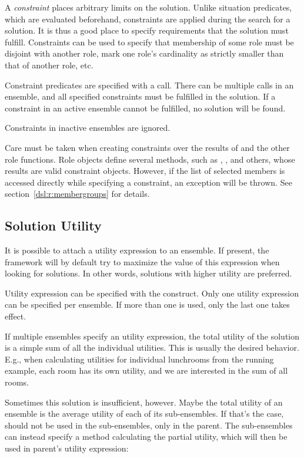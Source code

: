 A \textit{constraint} places arbitrary limits on the solution. Unlike situation
predicates, which are evaluated beforehand, constraints are applied during the search
for a solution. It is thus a good place to specify requirements that the solution must
fulfill. Constraints can be used to specify that membership of some role must be
disjoint with another role, mark one role's cardinality as strictly smaller than that of
another role, etc.

Constraint predicates are specified with a  call. There can be multiple
 calls in an ensemble, and all specified constraints must be fulfilled in
the solution. If a constraint in an active ensemble cannot be fulfilled, no solution
will be found.

Constraints in inactive ensembles are ignored.

Care must be taken when creating constraints over the results of  and the
other role functions. Role objects define several methods, such as , ,
and others, whose results are valid constraint objects. However, if the list of selected
members is accessed directly while specifying a constraint, an exception will be thrown.
See section~\ref{dsl:r:membergroups} for details.


\subsection{Solution Utility}
\label{dsl:c:utility}

It is possible to attach a utility expression to an ensemble. If present, the framework
will by default try to maximize the value of this expression when looking for solutions.
In other words, solutions with higher utility are preferred.

Utility expression can be specified with the  construct. Only one utility
expression can be specified per ensemble. If more than one  is used, only
the last one takes effect.

If multiple ensembles specify an utility expression, the total utility of the solution
is a simple sum of all the individual utilities. This is usually the desired behavior.
E.g., when calculating utilities for individual lunchrooms from the running example,
each room has its own utility, and we are interested in the sum of all rooms.

Sometimes this solution is insufficient, however. Maybe the total utility of an ensemble
is the average utility of each of its sub-ensembles. If that's the case, 
should not be used in the sub-ensembles, only in the parent. The sub-ensembles can
instead specify a method calculating the partial utility, which will then be used in
parent's utility expression:

